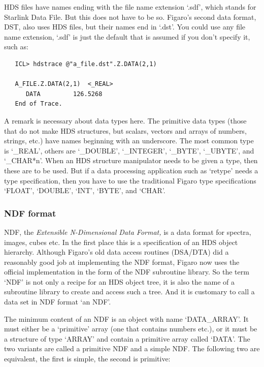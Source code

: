 \documentclass[11pt,twoside]{article}
\begin{document}
   HDS files have names ending with the file name extension `.sdf',
   which stands for Starlink Data File. But this does not have to be so.
   Figaro's second data format, DST, also uses HDS files, but their
   names end in `.dst'. You could use any file name extension, `.sdf'
   is just the default that is assumed if you don't specify it, such
   as:

\begin{verbatim}
   ICL> hdstrace @"a_file.dst".Z.DATA(2,1)

   A_FILE.Z.DATA(2,1)  <_REAL>
      DATA         126.5268
   End of Trace.
\end{verbatim}

   A remark is necessary about data types here. The primitive data
   types (those that do not make HDS structures, but scalars, vectors
   and arrays of numbers, strings, etc.) have names beginning with an
   underscore. The most common type is `\_REAL', others are
   `\_DOUBLE', `\_INTEGER', `\_BYTE', `\_UBYTE', and `\_CHAR*n'. When
   an HDS structure manipulator needs to be given a type, then these
   are to be used. But if a data processing application such as
   `retype' needs a type specification, then you have to use the
   traditional Figaro type specifications `FLOAT', `DOUBLE', `INT',
   `BYTE', and `CHAR'.


\subsubsection{\label{filesndf}NDF format}

   NDF, the
{\em Extensible N-Dimensional Data Format,\/}
   is a data format for spectra, images, cubes etc. In the first place
   this is a specification of an HDS object hierarchy. Although
   Figaro's old data access routines (DSA/DTA) did a reasonably good
   job at implementing the NDF format, Figaro now uses the official
   implementation in the form of the NDF subroutine library.
   So the term `NDF' is not only a recipe for an HDS object tree, it
   is also the name of a subroutine library to create and access such
   a tree. And it is customary to call a data set in NDF format `an
   NDF'.

   The minimum content of an NDF is an object with name
   `DATA\_ARRAY'. It must either be a `primitive' array (one that
   contains numbers etc.), or it must be a structure of type `ARRAY' and
   contain a primitive array called `DATA'. The two variants are
   called a primitive NDF and a simple NDF. The following two are
   equivalent, the first is simple, the second is primitive:
\end{document}
